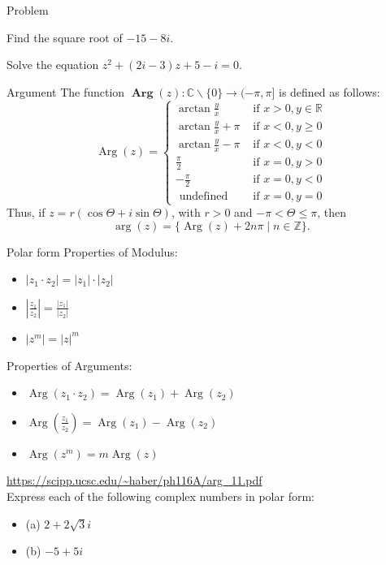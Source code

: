 \documentclass[11pt]{beamer}
\theoremstyle{plain}
\begin{document}
\begin{frame}{Problem}
    \begin{problem}
        Find the square root of $-15-8i$. 
    \end{problem}
    \begin{problem}
        Solve the equation $z^2+(2i-3)z+5-i=0$. 
    \end{problem}
\end{frame}
\begin{frame}{Argument}
    The function $\boldsymbol{\operatorname { A r g }}(z): \mathbb{C} \backslash\{0\} \rightarrow(-\pi, \pi]$ is defined as follows:
$$
\operatorname{Arg}(z)=\left\{\begin{array}{cl}
\arctan \frac{y}{x} & \text { if } x>0, y \in \mathbb{R} \\
\arctan \frac{y}{x}+\pi & \text { if } x<0, y \geq 0 \\
\arctan \frac{y}{x}-\pi & \text { if } x<0, y<0 \\
\frac{\pi}{2} & \text { if } x=0, y>0 \\
-\frac{\pi}{2} & \text { if } x=0, y<0 \\
\text { undefined } & \text { if } x=0, y=0
\end{array}\right.
$$
Thus, if $z=r(\cos \Theta+i \sin \Theta)$, with $r>0$ and $-\pi<\Theta \leq \pi$, then
$$
\arg (z)=\{\operatorname{Arg}(z)+2 n \pi \mid n \in \mathbb{Z}\} .
$$
\end{frame}
\begin{frame}{Polar form}
    Properties of Modulus:
    \begin{itemize}
        \item $|z_1\cdot z_2|=|z_1|\cdot|z_2|$
        \item $\left|\frac{z_1}{z_2}\right|=\frac{|z_1|}{|z_2|}$
        \item $|z^m|=|z|^m$
    \end{itemize}
    Properties of Arguments:
    \begin{itemize}
        \item $\operatorname{Arg} (z_1\cdot z_2)=\operatorname{Arg} (z_1)+\operatorname{Arg} (z_2)$
        \item $\operatorname{Arg}\left(\frac{z_1}{z_2}\right)=\operatorname{Arg}(z_1)-\operatorname{Arg}(z_2)$
        \item $\operatorname{Arg}(z^m)=m\operatorname{Arg}(z)$
    \end{itemize}
    \url{https://scipp.ucsc.edu/~haber/ph116A/arg_11.pdf}\\
    Express each of the following complex numbers in polar form:
    \begin{itemize}
        \item (a) $2+2\sqrt{3}i$
        \item (b) $-5+5i$
    \end{itemize}
\end{frame}
\end{document}
